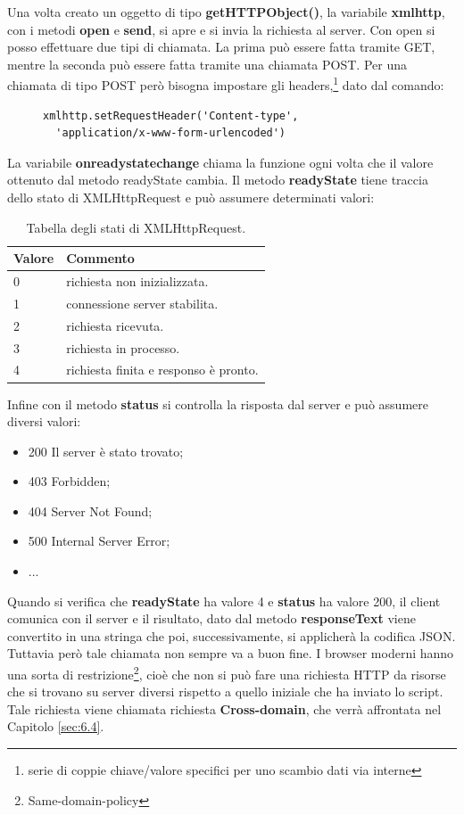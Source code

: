\documentclass[a4paper,11pt]{article}
\begin{document}
Una volta creato un oggetto di tipo \textbf{getHTTPObject()}, la variabile \textbf{xmlhttp}, con i metodi \textbf{open} e \textbf{send}, si apre e si invia la richiesta al server.\newline
Con open si posso effettuare due tipi di chiamata. La prima può essere fatta tramite GET, mentre la seconda può essere fatta tramite una chiamata POST. Per una chiamata di tipo POST però bisogna impostare gli headers,\footnote{serie di coppie chiave/valore specifici per uno scambio dati via interne} dato dal comando:
\begin{figure}[htb]
\begin{lstlisting}[language=HTML, basicstyle=\large]
xmlhttp.setRequestHeader('Content-type',
  'application/x-www-form-urlencoded')
\end{lstlisting}
\end{figure}\newline
La variabile \textbf{onreadystatechange} chiama la funzione ogni volta che il valore ottenuto dal metodo readyState cambia.
Il metodo \textbf{readyState} tiene traccia dello stato di XMLHttpRequest e può assumere determinati valori:
\begin{table}[htb]
\begin{center}				
\begin{tabular}{|>{\small}l|>{\small}l|}
	\hline	\textbf{Valore} & \textbf{Commento}\\				
	\hline	0 & richiesta non inizializzata.\\
	\hline	1 & connessione server stabilita.\\
	\hline	2 & richiesta ricevuta.\\
	\hline	3 & richiesta in processo.\\
	\hline	4 & richiesta finita e responso è pronto.\\
	\hline			
\end{tabular}	
\caption{Tabella degli stati di XMLHttpRequest.}	
\end{center}	
\end{table}\newpage
Infine con il metodo \textbf{status} si controlla la risposta dal server e può  assumere diversi valori:
\begin{itemize}
	\item 200 Il server è stato trovato;
	\item 403 Forbidden;
	\item 404 Server Not Found;
	\item 500 Internal Server Error;
	\item ...
\end{itemize}
Quando si verifica che \textbf{readyState} ha valore 4 e \textbf{status} ha valore 200, il client comunica con il server e il risultato, dato dal metodo \textbf{responseText} viene convertito in una stringa che poi, successivamente,  si applicherà la codifica JSON.
Tuttavia però tale chiamata non sempre va a buon fine. I browser moderni hanno una sorta di restrizione\footnote{Same-domain-policy}, cioè che non si può fare una richiesta HTTP da risorse che si trovano su server diversi rispetto a quello iniziale che ha inviato lo script.\newline
Tale richiesta viene chiamata richiesta \textbf{Cross-domain}, che verrà affrontata nel Capitolo \ref{sec:6.4}.
\newpage
\end{document}
